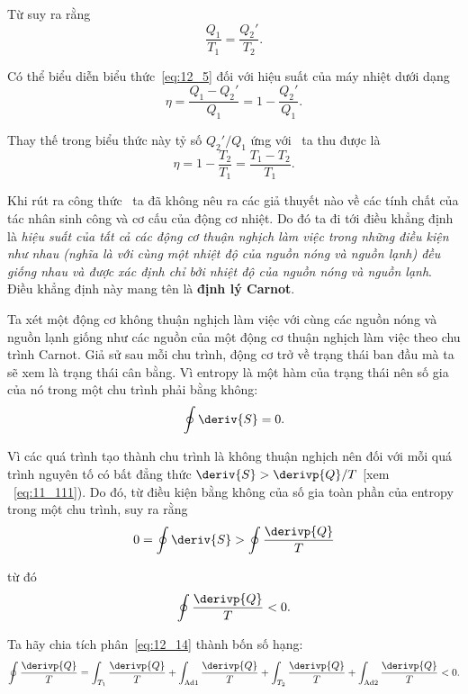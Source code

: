 \noindent
Từ  suy ra rằng
\begin{equation}\label{eq:12_11}
	\frac{Q_1}{T_1} = \frac{Q_2'}{T_2}.
\end{equation}

Có thể biểu diễn biểu thức~\eqref{eq:12_5} đối với hiệu suất của máy nhiệt dưới dạng
\begin{equation}\label{eq:12_12}
	\eta = \frac{Q_1-Q_2'}{Q_1} = 1 - \frac{Q_2'}{Q_1}.
\end{equation}

\noindent
Thay thế trong biểu thức này tỷ số $Q_2'/Q_1$ ứng với~ ta thu được là
\begin{equation}\label{eq:12_13}
	\eta = 1 - \frac{T_2}{T_1} = \frac{T_1 - T_2}{T_1}.
\end{equation}

Khi rút ra công thức~ ta đã không nêu ra các giả thuyết nào về các tính chất của tác nhân sinh công và cơ cấu của động cơ nhiệt. Do đó ta đi tới điều khẳng định là \textit{hiệu suất của tất cả các động cơ thuận nghịch làm việc trong những điều kiện như nhau (nghĩa là với cùng một nhiệt độ của nguồn nóng và nguồn lạnh) đều giống nhau và được xác định chỉ bởi nhiệt độ của nguồn nóng và nguồn lạnh}. Điều khẳng định này mang tên là \textbf{định lý Carnot}.

Ta xét một động cơ không thuận nghịch làm việc với cùng các nguồn nóng và nguồn lạnh giống như các nguồn của một động cơ thuận nghịch làm việc theo chu trình Carnot. Giả sử sau mỗi chu trình, động cơ trở về trạng thái ban đầu mà ta sẽ xem là trạng thái cân bằng. Vì entropy là một hàm của trạng thái nên số gia của nó trong một chu trình phải bằng không:
\begin{equation*}
	\oint \deriv{S} = 0.
\end{equation*}

Vì các quá trình tạo thành chu trình là không thuận nghịch nên đối với mỗi quá trình nguyên tố có bất đẳng thức $\deriv{S}>\derivp{Q}/T$ [xem ~\eqref{eq:11_111}). Do đó, từ điều kiện bằng không của số gia toàn phần của entropy trong một chu trình, suy ra rằng
\begin{equation*}
	0 = \oint \deriv{S} > \oint \frac{\derivp{Q}}{T}
\end{equation*}

\noindent
từ đó
\begin{equation}\label{eq:12_14}
	\oint \frac{\derivp{Q}}{T} < 0.
\end{equation}

\noindent
Ta hãy chia tích phân~\eqref{eq:12_14} thành bốn số hạng:
\begin{equation}\label{eq:12_15}
	\oint \frac{\derivp{Q}}{T} = \int_{T_1} \frac{\derivp{Q}}{T} + \int_{\text{Ad}1} \frac{\derivp{Q}}{T} + \int_{T_2} \frac{\derivp{Q}}{T} + \int_{\text{Ad}2} \frac{\derivp{Q}}{T} < 0.
\end{equation}

